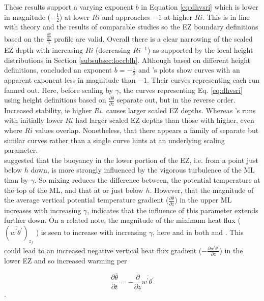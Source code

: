 These results support a varying exponent $b$ in Equation \ref{eq:dhvsri} which is lower in magnitude ($-\frac{1}{2}$) at lower $Ri$ and approaches $-1$ at higher $Ri$.  This is in line with theory and the results of comparable studies so the EZ boundary definitions based on the $\frac{\frac{\partial \overline{\theta}}{\partial z}}{\gamma}$ profile are valid.  Overall there is a clear narrowing of the scaled EZ depth with increasing $Ri$ (decreasing $Ri^{-1}$) as supported by the local height distributions in Section \ref{subsubsec:loccblh}.  Although based on different height definitions, \cite{FedConzMir04} concluded an exponent $b = -\frac{1}{2}$ and \cite{BrooksFowler2}'s plots show curves with an apparent exponent less in magnitude than $-1$.  Their curves representing each run fanned out.  Here, before scaling by $\gamma$, the curves representing Eq. \ref{eq:dhvsri} using height definitions based on $\frac{\partial \overline{\theta}}{\partial z}$ separate out, but in the reverse order.  Increased stability, ie higher $Ri$, causes larger scaled EZ depths.  Whereas \cite{BrooksFowler2}'s runs with initially lower $Ri$ had larger scaled EZ depths than those with higher, even where $Ri$ values overlap. Nonetheless, that there appears a family of separate but similar curves rather than a single curve hints at an underlying scaling parameter.\\     

\cite{GarciaMellado} suggested that the buoyancy in the lower portion of the EZ, i.e. from a point just below $h$ down, is more strongly influenced by the vigorous turbulence of the ML than by $\gamma$.  So mixing reduces the difference between, the potential temperature at the top of the ML, and that at or just below $h$.  However, that the magnitude of the average vertical potential temperature gradient ($\frac{\partial \overline{\theta}}{\partial z}$) in the upper ML increases with increasing $\gamma$, indicates that the influence of this parameter extends further down.  On a related note, the magnitude of the minimum heat flux ( $(\overline{w^{'}\theta^{'}})_{z_{f}}$ ) is seen to increase with increasing $\gamma$, here and in both \cite{Sorbjan1} and \cite{FedConzMir04}.  This could lead to an increased negative vertical heat flux gradient ($-\frac{\partial \overline{w^{'}\theta^{'}}}{\partial z}$) in the lower EZ and so increased warming per

\begin{equation}
\frac{\partial \overline{\theta}}{\partial t} = -\frac{\partial}{\partial z}\overline{w^{'}\theta^{'}}
\end{equation}.


